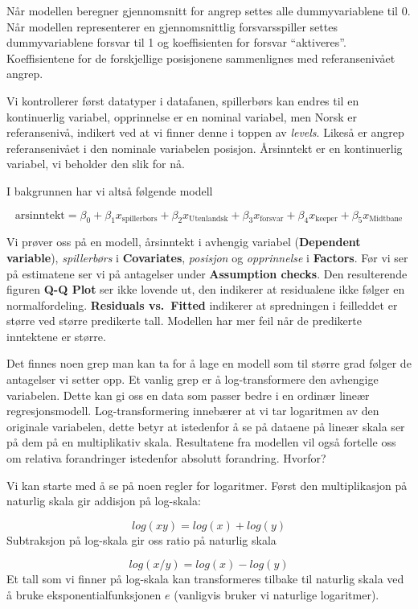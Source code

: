 \documentclass[
  letterpaper,
  DIV=11,
  numbers=noendperiod,
  oneside]{scrreprt}
\begin{document}
Når modellen beregner gjennomsnitt for angrep settes alle
dummyvariablene til 0. Når modellen representerer en gjennomsnittlig
forsvarsspiller settes dummyvariablene forsvar til 1 og koeffisienten
for forsvar ``aktiveres''. Koeffisientene for de forskjellige
posisjonene sammenlignes med referansenivået angrep.

Vi kontrollerer først datatyper i datafanen, spillerbørs kan endres til
en kontinuerlig variabel, opprinnelse er en nominal variabel, men Norsk
er referansenivå, indikert ved at vi finner denne i toppen av
\emph{levels}. Likeså er angrep referansenivået i den nominale
variabelen posisjon. Årsinntekt er en kontinuerlig variabel, vi beholder
den slik for nå.

I bakgrunnen har vi altså følgende modell

\[\text{arsinntekt} = \beta_0 + \beta_1 x_\text{spillerbors} + \beta_2 x_\text{Utenlandsk} +\beta_3 x_\text{forsvar} + \beta_4 x_\text{keeper} +\beta_5 x_\text{Midtbane}\]

Vi prøver oss på en modell, årsinntekt i avhengig variabel
(\textbf{Dependent variable}), \emph{spillerbørs} i \textbf{Covariates},
\emph{posisjon} og \emph{opprinnelse} i \textbf{Factors}. Før vi ser på
estimatene ser vi på antagelser under \textbf{Assumption checks}. Den
resulterende figuren \textbf{Q-Q Plot} ser ikke lovende ut, den
indikerer at residualene ikke følger en normalfordeling.
\textbf{Residuals vs.~Fitted} indikerer at spredningen i feilleddet er
større ved større predikerte tall. Modellen har mer feil når de
predikerte inntektene er større.

Det finnes noen grep man kan ta for å lage en modell som til større grad
følger de antagelser vi setter opp. Et vanlig grep er å log-transformere
den avhengige variabelen. Dette kan gi oss en data som passer bedre i en
ordinær lineær regresjonsmodell. Log-transformering innebærer at vi tar
logaritmen av den originale variabelen, dette betyr at istedenfor å se
på dataene på lineær skala ser på dem på en multiplikativ skala.
Resultatene fra modellen vil også fortelle oss om relativa forandringer
istedenfor absolutt forandring. Hvorfor?

Vi kan starte med å se på noen regler for logaritmer. Først den
multiplikasjon på naturlig skala gir addisjon på log-skala:

\[log(xy)= log(x) + log(y)\] Subtraksjon på log-skala gir oss ratio på
naturlig skala

\[log(x/y) = log(x) - log(y)\] Et tall som vi finner på log-skala kan
transformeres tilbake til naturlig skala ved å bruke
eksponentialfunksjonen \(e\) (vanligvis bruker vi naturlige logaritmer).
\end{document}
